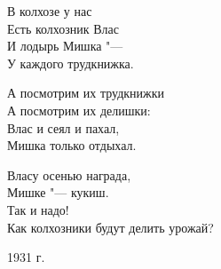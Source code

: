 \begin{flushleft}
В колхозе у нас\\
Есть колхозник Влас\\
И лодырь Мишка "---\\
У каждого трудкнижка.

А посмотрим их трудкнижки\\
А посмотрим их делишки:\\
Влас и сеял и пахал,\\
Мишка только отдыхал.

Власу осенью награда,\\
Мишке "--- кукиш.\\
Так и надо!\\
\vspace{1em}
Как колхозники будут делить урожай?\\

\end{flushleft}
\vspace{1em}
\begin{flushright}
1931 г.
\end{flushright}
